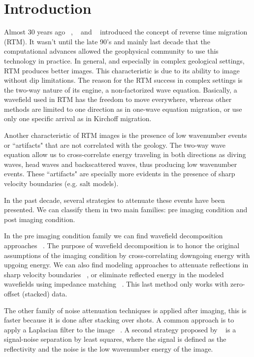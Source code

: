\section{Introduction}

Almost 30 years ago  ~\cite{baysal:1514}, ~\cite{whitmore:382}
 and ~\cite{GPR:GPR413} introduced the concept of reverse time migration (RTM). 
It wasn't until the late 90's and mainly last decade that the computational advances
allowed the geophysical community to use this technology in practice. In general, and 
especially in complex geological settings,  RTM produces better images. This 
characteristic is due to its ability to image without dip limitations. The
reason for the RTM success in complex settings is the two-way nature of its 
engine, a non-factorized wave equation. Basically, a wavefield used in RTM
has the freedom to move everywhere, whereas other methods are limited to one
direction as in one-wave equation migration, or use only one specific arrival 
as in Kirchoff migration.

Another characteristic of RTM images is the presence of low 
wavenumber events or ``artifacts" that are not correlated with the geology. The two-way
wave equation allow us to cross-correlate energy traveling in both directions as diving waves,
head waves and backscattered waves, thus producing low wavenumber events. These
``artifacts" are specially more evidents in the presence of sharp velocity boundaries (e.g. salt 
models). 

In the past decade, several strategies to attenuate these events have been presented. 
We can classify them in two main families: pre imaging condition and post imaging condition. 

In the pre imaging condition family we can find wavefield decomposition approaches
~\citep[]{liu:S29,fei:3130}. The purpose of wavefield decomposition is to honor the original
assumptions of the imaging condition by cross-correlating downgoing energy with upgoing energy.
We can also find modeling approaches to attenuate reflections in sharp velocity boundaries 
~\citep{fletcher:2049}, or eliminate reflected energy in the modeled wavefields using 
impedance matching ~\citep{baysal:132}. This last method only works with zero-offset (stacked) data.  

The other family of noise attenuation techniques is applied after imaging, this is faster because
it is done after stacking over shots. A common approach is to apply a Laplacian filter
to the image ~\citep{youn:246}. A second strategy proposed by ~\cite{guitton:S19} is a signal-noise
separation by least squares, where the signal is defined as the reflectivity and the noise is the low 
wavenumber energy of the image. 

